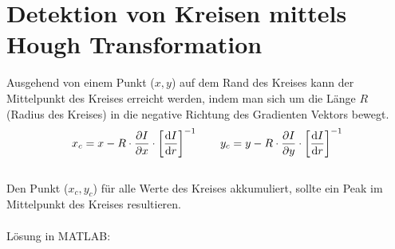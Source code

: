 \section{Detektion von Kreisen mittels Hough Transformation}
Ausgehend von einem Punkt ($x,y$) auf dem Rand des Kreises kann der Mittelpunkt des  Kreises erreicht werden, indem man sich um die Länge $R$ (Radius des Kreises) in die negative Richtung des Gradienten Vektors bewegt.
\[
	x_c = x - R \cdot \frac{\partial I}{\partial x}\cdot \left[\frac{\mathrm{d} I}{\mathrm{d} r} \right]^{-1} \qquad
	y_c = y - R \cdot \frac{\partial I}{\partial y}\cdot \left[\frac{\mathrm{d} I}{\mathrm{d} r} \right]^{-1}
\]
~\\
Den Punkt ($x_c,y_c$) für alle Werte des Kreises akkumuliert, sollte ein Peak im Mittelpunkt des Kreises resultieren.
~\\\\
Lösung in MATLAB:
\lstset{language=Matlab}

~\\
